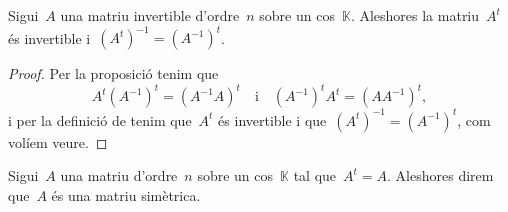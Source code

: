 \documentclass[../../Main.tex]{subfiles}
\begin{document}
	\begin{proposition}
		\label{prop:transposada d'una invertible és invertible}
		Sigui~\(A\) una matriu invertible d'ordre~\(n\) sobre un cos~\(\mathbb{K}\).
		Aleshores la matriu~\(A^{t}\) és invertible i~\(\left(A^{t}\right)^{-1}=\left(A^{-1}\right)^{t}\).
		\begin{proof}
			Per la proposició  tenim que
			\[
			    A^{t}\left(A^{-1}\right)^{t}=\left(A^{-1}A\right)^{t}\quad\text{i}\quad \left(A^{-1}\right)^{t}A^{t}=\left(AA^{-1}\right)^{t},
			\]
			i per la definició de  tenim que~\(A^{t}\) és invertible i que~\(\left(A^{t}\right)^{-1}=\left(A^{-1}\right)^{t}\), com volíem veure.
		\end{proof}
	\end{proposition}
	\begin{definition}
		\label{def:matriu simètrica}
		Sigui~\(A\) una matriu d'ordre~\(n\) sobre un cos~\(\mathbb{K}\) tal que~\(A^{t}=A\).
		Aleshores direm que~\(A\) és una matriu simètrica.
	\end{definition}
\end{document}
